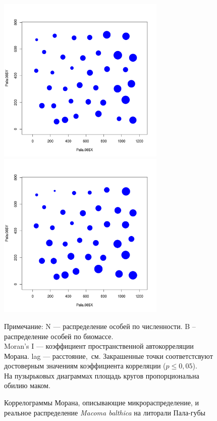 \begin{figure}[h]
	\begin{minipage}[b]{.5\linewidth}
	\begin{center}
		\includegraphics[width=80mm]{../Barenc_Sea/distribution_Moran/Pala_N_Macoma_bubbles.pdf}
	\end{center}
	\end{minipage}
	\hfil %
	\begin{minipage}[b]{.5\linewidth}
	\begin{center}
		\includegraphics[width=80mm]{../Barenc_Sea/distribution_Moran/Pala_B_Macoma_bubbles.pdf}
	\end{center}
	\end{minipage}
	\caption{Коррелограммы Морана, описывающие микрораспределение, и реальное распределение {\it Macoma balthica} на литорали Пала-губы}
	\label{ris:moransI_Pala_Macoma}

	\footnotesize{Примечание: N --- распределение особей по численности. B -- распределение особей по биомассе.\\
	Moran's I --- коэффициент пространственной автокорреляции Морана. lag --- расстояние,~см. Закрашенные точки соответстсвуют достоверным значениям коэффициента корреляции ($p \le 0,05$).\\
	На пузырьковых диаграммах площадь кругов пропорциональна обилию маком.}
	\end{figure}


